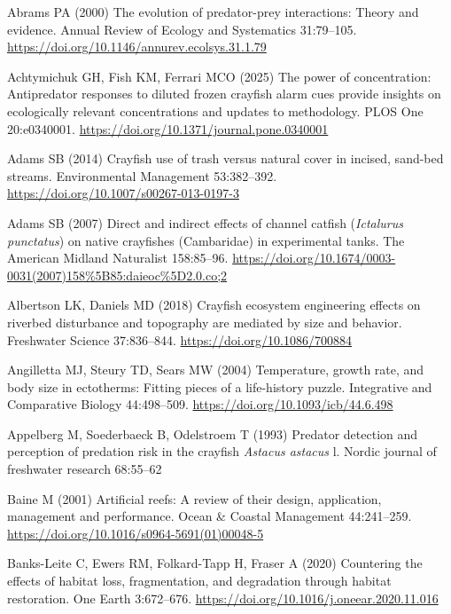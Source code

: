 \documentclass[
  12pt,
  a4paper,
]{scrbook}
\newlength{\cslhangindent}
\newenvironment{CSLReferences}[2] %
 {\begin{list}{}{%
  \setlength{\itemindent}{0pt}
  \setlength{\leftmargin}{0pt}
  \setlength{\parsep}{0pt}
  \ifodd #1
   \setlength{\leftmargin}{\cslhangindent}
   \setlength{\itemindent}{-1\cslhangindent}
  \fi
  \setlength{\itemsep}{#2\baselineskip}}}
 {\end{list}}
\begin{document}
\protect{}\label{refs}
\begin{CSLReferences}{1}{1}
Abrams PA (2000) The evolution of predator-prey interactions: Theory and
evidence. Annual Review of Ecology and Systematics 31:79--105.
\url{https://doi.org/10.1146/annurev.ecolsys.31.1.79}

Achtymichuk GH, Fish KM, Ferrari MCO (2025) The power of concentration:
Antipredator responses to diluted frozen crayfish alarm cues provide
insights on ecologically relevant concentrations and updates to
methodology. PLOS One 20:e0340001.
\url{https://doi.org/10.1371/journal.pone.0340001}

Adams SB (2014) Crayfish use of trash versus natural cover in incised,
sand-bed streams. Environmental Management 53:382--392.
\url{https://doi.org/10.1007/s00267-013-0197-3}

Adams SB (2007) Direct and indirect effects of channel catfish
({\emph{Ictalurus punctatus}}) on native crayfishes ({Cambaridae}) in
experimental tanks. The American Midland Naturalist 158:85--96.
\url{https://doi.org/10.1674/0003-0031(2007)158\%5B85:daieoc\%5D2.0.co;2}

Albertson LK, Daniels MD (2018) Crayfish ecosystem engineering effects
on riverbed disturbance and topography are mediated by size and
behavior. Freshwater Science 37:836--844.
\url{https://doi.org/10.1086/700884}

Angilletta MJ, Steury TD, Sears MW (2004) Temperature, growth rate, and
body size in ectotherms: Fitting pieces of a life-history puzzle.
Integrative and Comparative Biology 44:498--509.
\url{https://doi.org/10.1093/icb/44.6.498}

Appelberg M, Soederbaeck B, Odelstroem T (1993) Predator detection and
perception of predation risk in the crayfish {\emph{Astacus astacus}} l.
Nordic journal of freshwater research 68:55--62

Baine M (2001) Artificial reefs: A review of their design, application,
management and performance. Ocean \& Coastal Management 44:241--259.
\url{https://doi.org/10.1016/s0964-5691(01)00048-5}

Banks-Leite C, Ewers RM, Folkard-Tapp H, Fraser A (2020) Countering the
effects of habitat loss, fragmentation, and degradation through habitat
restoration. One Earth 3:672--676.
\url{https://doi.org/10.1016/j.oneear.2020.11.016}


\end{CSLReferences}
\end{document}
